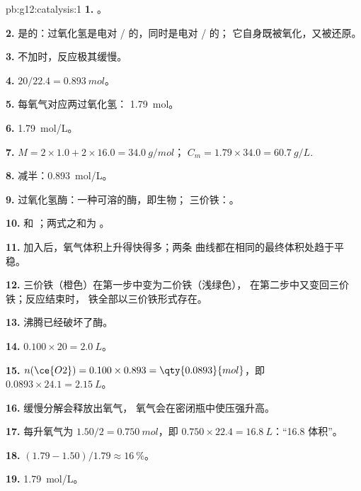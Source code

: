 \begin{solution}{pb:g12:catalysis:1}
\textbf{1.} 。

\textbf{2.} 是的：过氧化氢是电对
/ 的，同时是电对 / 的；
它自身既被氧化，又被还原。

\textbf{3.} 不加时，反应极其缓慢。

\textbf{4.} $20 / 22.4 = \qty{0.893}{mol}$。

\textbf{5.} 每氧气对应两过氧化氢：
\qty{1.79}{mol}。

\textbf{6.} \qty{1.79}{mol/L}。

\textbf{7.} $M = 2 \times 1.0 + 2 \times 16.0 = \qty{34.0}{g/mol}$；
$C_m = 1.79 \times 34.0 = \qty{60.7}{g/L}$.

\textbf{8.} 减半：\qty{0.893}{mol/L}。

\textbf{9.} 过氧化氢酶：一种可溶的酶，即生物；
三价铁：。

\textbf{10.}  和
；两式之和为
。

\textbf{11.} 加入后，氧气体积上升得快得多；两条
曲线都在相同的最终体积处趋于平稳。

\textbf{12.} 三价铁（橙色）在第一步中变为二价铁（浅绿色），
在第二步中又变回三价铁；反应结束时，
铁全部以三价铁形式存在。

\textbf{13.} 沸腾已经破坏了酶。

\textbf{14.} $0.100 \times 20 = \qty{2.0}{L}$。

\textbf{15.} $n(\ce{O2}) = 0.100 \times 0.893 = \qty{0.0893}{mol}$，即
$0.0893 \times 24.1 = \qty{2.15}{L}$。

\textbf{16.} 缓慢分解会释放出氧气，
氧气会在密闭瓶中使压强升高。

\textbf{17.} 每升氧气为 $1.50 / 2 = \qty{0.750}{mol}$，即
$0.750 \times 22.4 = \qty{16.8}{L}$：“16.8 体积”。

\textbf{18.} $(1.79 - 1.50)/1.79 \approx \qty{16}{\percent}$。

\textbf{19.} \qty{1.79}{mol/L}。
\end{solution}
